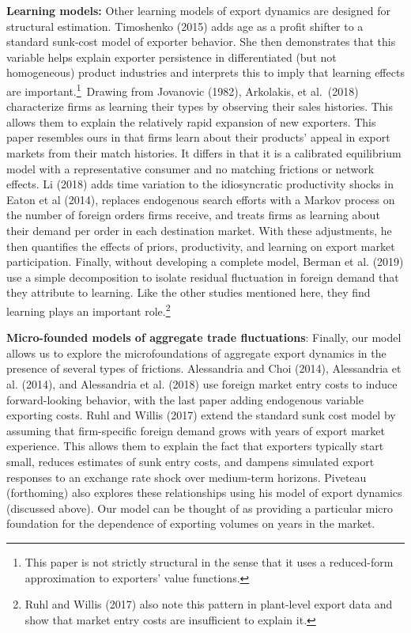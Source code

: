 \documentclass[12pt]{article}
\begin{document}
\textbf{Learning models:} Other learning models of export dynamics are
designed for structural estimation. Timoshenko (2015) adds age as a profit
shifter to a standard sunk-cost model of exporter behavior. She then
demonstrates that this variable helps explain exporter persistence in
differentiated (but not homogeneous) product industries and interprets this
to imply that learning effects are important.\footnote{%
This paper is not strictly structural in the sense that it uses a
reduced-form approximation to exporters' value functions.\medskip}\ Drawing from
Jovanovic (1982), Arkolakis, et al.\ (2018) characterize firms as learning
their types by observing their sales histories. This allows them to explain
the relatively rapid expansion of new exporters. This paper resembles ours
in that firms learn about their products' appeal in export markets from
their match histories. It differs in that it is a calibrated equilibrium
model with a representative consumer and no matching frictions or network
effects. Li (2018) adds time variation to the idiosyncratic productivity
shocks in Eaton et al (2014), replaces endogenous search efforts with a
Markov process on the number of foreign orders firms receive, and treats
firms as learning about their demand per order in each destination market.
With these adjustments, he then quantifies the effects of priors,
productivity, and learning on export market participation. Finally, without
developing a complete model, Berman et al. (2019) use a simple decomposition
to isolate residual fluctuation in foreign demand that they attribute to
learning. Like the other studies mentioned here, they find learning plays an
important role.\renewcommand{\baselinestretch}{1}\footnote{%
Ruhl and Willis (2017) also note this pattern in plant-level export data and
show that market entry costs are insufficient to explain it.\medskip}

\textbf{Micro-founded models of aggregate trade fluctuations}: Finally, our
model allows us to explore the microfoundations of aggregate export dynamics
in the presence of several types of frictions. Alessandria and Choi (2014),
Alessandria et al. (2014), and Alessandria et al. (2018) use foreign market
entry costs to induce forward-looking behavior, with the last paper adding
endogenous variable exporting costs. Ruhl and Willis (2017) extend the
standard sunk cost model by assuming that firm-specific foreign demand grows
with years of export market experience. This allows them to explain the fact
that exporters typically start small, reduces estimates of sunk entry costs,
and dampens simulated export responses to an exchange rate shock over
medium-term horizons. Piveteau (forthoming) also explores these
relationships using his model of export dynamics (discussed above). Our
model can be thought of as providing a particular micro foundation for the
dependence of exporting volumes on years in the market.
\end{document}
